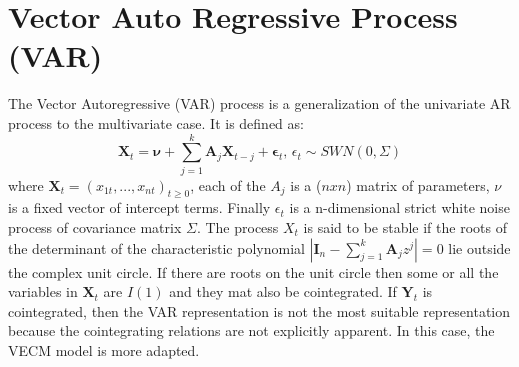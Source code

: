 \documentclass[11pt,a4,twosided,singlespacing,titlepagenumber=on]{scrreprt}
\numberwithin{equation}{chapter} %
\theoremstyle{remark}
\newcommand{\matr}[1]{\mathbf{#1}}
\begin{document}
\section{Vector Auto Regressive Process (VAR)}
The Vector Autoregressive (VAR) process is a generalization of the univariate AR process to the multivariate case. It is defined as:
\begin{equation}
\matr{X}_t = \matr{\nu} + \sum_{j=1}^k \matr{A}_j \matr{X}_{t-j} + \matr{\epsilon}_t \text{, } \epsilon_t \sim SWN(0, \Sigma)
\end{equation}
where $\matr{X}_t = (x_{1t},...,x_{nt})_{t \geq 0}$, each of the $A_j$ is a ($nxn$) matrix of parameters, $\nu$ is a fixed vector of intercept terms. Finally $\epsilon_t$ is a n-dimensional strict white noise process of covariance matrix $\Sigma$. The process $X_t$ is said to be stable if the roots of the determinant of the characteristic polynomial $|\matr{I}_n - \sum_{j=1}^k \matr{A}_j z^j| = 0$ lie outside the complex unit circle. If there are roots on the unit circle then some or all the variables in $\matr{X}_t$ are $I(1)$ and they mat also be cointegrated. If $\matr{Y}_t$ is cointegrated, then the VAR representation is not the most suitable representation because the cointegrating relations are not explicitly apparent. In this case, the VECM model is more adapted.
\end{document}
